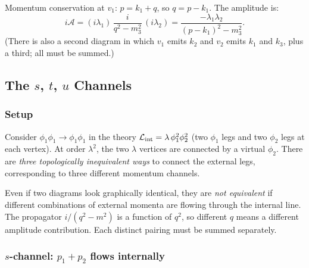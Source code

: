\documentclass[../main.tex]{subfiles}
\begin{document}
Momentum conservation at $v_1$: $p = k_1 + q$, so $q = p - k_1$.  The amplitude is:
\begin{equation}
  i\mathcal{A}
  = (i\lambda_1)\,\frac{i}{q^2 - m_3^2}\,(i\lambda_2)
  = \frac{-\lambda_1\lambda_2}{(p - k_1)^2 - m_3^2}.
  \label{eq:lec05:two-vertex-amp}
\end{equation}
(There is also a second diagram in which $v_1$ emits $k_2$ and $v_2$ emits $k_1$ and $k_3$, plus a third; all must be summed.)

\subsection*{The $s$, $t$, $u$ Channels}

\subsubsection*{Setup}

Consider $\phi_1\phi_1 \to \phi_1\phi_1$ in the theory $\mathcal{L}_{\rm int} = \lambda\,\phi_1^2\phi_2^2$ (two $\phi_1$ legs and two $\phi_2$ legs at each vertex).  At order $\lambda^2$, the two $\lambda$ vertices are connected by a virtual $\phi_2$.  There are \emph{three topologically inequivalent ways} to connect the external legs, corresponding to three different momentum channels.

\begin{remark}
Even if two diagrams look graphically identical, they are \emph{not equivalent} if different combinations of external momenta are flowing through the internal line.  The propagator $i/(q^2 - m^2)$ is a function of $q^2$, so different $q$ means a different amplitude contribution.  Each distinct pairing must be summed separately.
\end{remark}

\subsubsection*{$s$-channel: $p_1 + p_2$ flows internally}

\begin{center}
\end{center}
\end{document}
